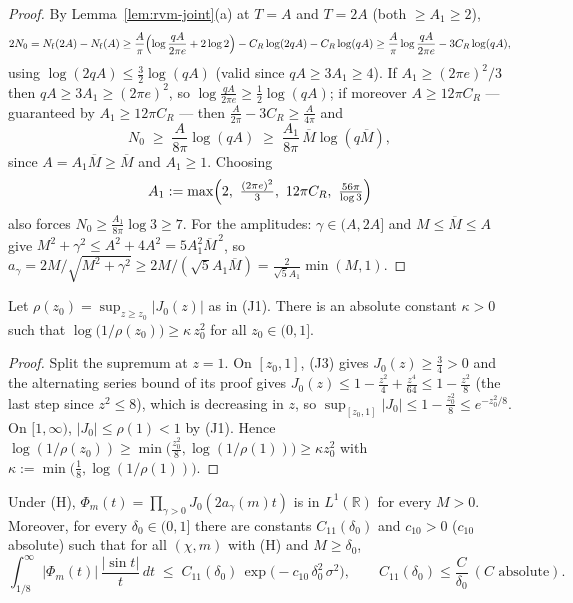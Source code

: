 \begin{proof}
By Lemma~\ref{lem:rvm-joint}(a) at $T=A$ and $T=2A$ (both $\ge A_1\ge2$),
\[
2N_0=N_{\mathrm f}(2A)-N_{\mathrm f}(A)
\ge\frac{A}{\pi}\Bigl(\log\frac{qA}{2\pi e}+2\log2\Bigr)
-C_R\log(2qA)-C_R\log(qA)
\ge\frac{A}{\pi}\log\frac{qA}{2\pi e}-3C_R\log(qA),
\]
using $\log(2qA)\le\tfrac32\log(qA)$ (valid since $qA\ge3A_1\ge4$).
If $A_1\ge(2\pi e)^2/3$ then $qA\ge3A_1\ge(2\pi e)^2$, so
$\log\tfrac{qA}{2\pi e}\ge\tfrac12\log(qA)$; if moreover
$A\ge12\pi C_R$ --- guaranteed by $A_1\ge12\pi C_R$ --- then
$\tfrac{A}{2\pi}-3C_R\ge\tfrac{A}{4\pi}$ and
\[
N_0\;\ge\;\frac{A}{8\pi}\log(qA)\;\ge\;\frac{A_1}{8\pi}\,
\overline M\log(q\overline M),
\]
since $A=A_1\overline M\ge\overline M$ and $A_1\ge1$. Choosing
\[
A_1:=\max\Bigl(2,\ \tfrac{(2\pi e)^2}{3},\ 12\pi C_R,\
\tfrac{56\pi}{\log3}\Bigr)
\]
also forces $N_0\ge\tfrac{A_1}{8\pi}\log3\ge7$. For the amplitudes:
$\gamma\in(A,2A]$ and $M\le\overline M\le A$ give
$M^2+\gamma^2\le A^2+4A^2=5A_1^2\overline M^{\,2}$, so
$a_\gamma=2M/\sqrt{M^2+\gamma^2}
\ge2M/(\sqrt5A_1\overline M)=\tfrac{2}{\sqrt5A_1}\min(M,1)$.
\end{proof}

\begin{lemma}[rate in (J1)]\label{lem:rho-rate}
Let $\rho(z_0)=\sup_{z\ge z_0}|J_0(z)|$ as in (J1). There is an
absolute constant $\kappa>0$ such that
$\log\bigl(1/\rho(z_0)\bigr)\ge\kappa\,z_0^{2}$ for all
$z_0\in(0,1]$.
\end{lemma}

\begin{proof}
Split the supremum at $z=1$. On $[z_0,1]$, (J3) gives $J_0(z)\ge\tfrac34>0$
and the alternating series bound of its proof gives
$J_0(z)\le1-\tfrac{z^2}4+\tfrac{z^4}{64}\le1-\tfrac{z^2}8$ (the last
step since $z^2\le8$), which is decreasing in $z$, so
$\sup_{[z_0,1]}|J_0|\le1-\tfrac{z_0^2}8\le e^{-z_0^2/8}$. On
$[1,\infty)$, $|J_0|\le\rho(1)<1$ by (J1). Hence
$\log(1/\rho(z_0))\ge\min\bigl(\tfrac{z_0^2}8,\log(1/\rho(1))\bigr)
\ge\kappa z_0^2$ with $\kappa:=\min\bigl(\tfrac18,\log(1/\rho(1))\bigr)$.
\end{proof}

\begin{lemma}\label{lem:bigt-joint}
Under (H), $\Phi_m(t)=\prod_{\gamma>0}J_0(2a_\gamma(m)t)$ is in
$L^1(\mathbb R)$ for every $M>0$. Moreover, for every
$\delta_0\in(0,1]$ there are constants $C_{11}(\delta_0)$ and
$c_{10}>0$ ($c_{10}$ absolute) such that for all $(\chi,m)$ with (H)
and $M\ge\delta_0$,
\begin{equation}\label{eq:tailq}
\int_{1/8}^\infty|\Phi_m(t)|\,\frac{|\sin t|}{t}\,dt
\;\le\;C_{11}(\delta_0)\,
\exp\bigl(-c_{10}\,\delta_0^{2}\,\sigma^{2}\bigr),
\qquad
C_{11}(\delta_0)\le\frac{C}{\delta_0}\ (C\text{ absolute}).
\end{equation}
\end{lemma}

